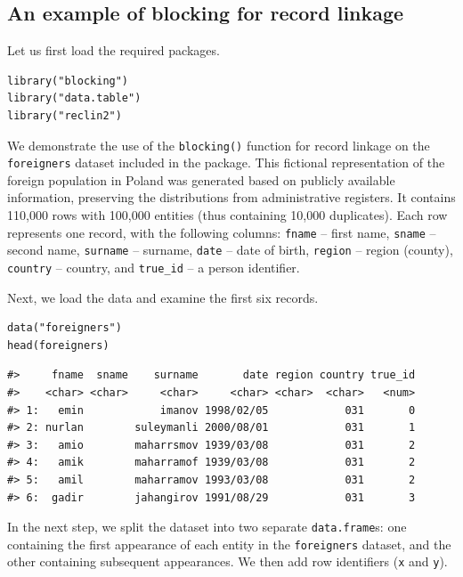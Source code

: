 \subsection{An example of blocking for record linkage}\label{an-example-of-blocking-for-record-linkage}

Let us first load the required packages.

\begin{verbatim}
library("blocking")
library("data.table")
library("reclin2")
\end{verbatim}

We demonstrate the use of the \texttt{blocking()} function for record linkage
on the \texttt{foreigners} dataset included in the package. This fictional
representation of the foreign population in Poland was generated based
on publicly available information, preserving the distributions from
administrative registers. It contains 110,000 rows with 100,000 entities
(thus containing 10,000 duplicates). Each row represents one record,
with the following columns: \texttt{fname} -- first name, \texttt{sname} -- second
name, \texttt{surname} -- surname, \texttt{date} -- date of birth, \texttt{region} -- region
(county), \texttt{country} -- country, and \texttt{true\_id} -- a person identifier.

Next, we load the data and examine the first six records.

\begin{verbatim}
data("foreigners")
head(foreigners)
\end{verbatim}

\begin{verbatim}
#>     fname  sname    surname       date region country true_id
#>    <char> <char>     <char>     <char> <char>  <char>   <num>
#> 1:   emin            imanov 1998/02/05            031       0
#> 2: nurlan        suleymanli 2000/08/01            031       1
#> 3:   amio        maharrsmov 1939/03/08            031       2
#> 4:   amik        maharramof 1939/03/08            031       2
#> 5:   amil        maharramov 1993/03/08            031       2
#> 6:  gadir        jahangirov 1991/08/29            031       3
\end{verbatim}

In the next step, we split the dataset into two separate \texttt{data.frame}s:
one containing the first appearance of each entity in the \texttt{foreigners}
dataset, and the other containing subsequent appearances. We then add
row identifiers (\texttt{x} and \texttt{y}).

